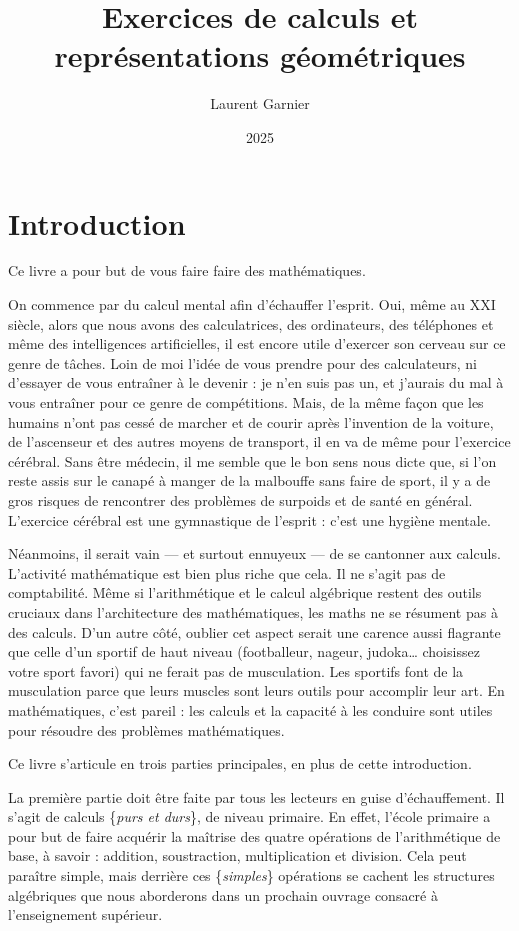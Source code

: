 \documentclass[11pt]{article}
\author{Laurent Garnier}
\date{2025}
\title{Exercices de calculs et représentations géométriques}
\begin{document}
\maketitle



\section{Introduction}
\label{sec:orgbdfe192}

Ce livre a pour but de vous faire faire des mathématiques. 

On commence par du calcul mental afin d’échauffer l’esprit. Oui, même
au XXI siècle, alors que nous avons des calculatrices, des
ordinateurs, des téléphones et même des intelligences artificielles,
il est encore utile d’exercer son cerveau sur ce genre de tâches. Loin
de moi l’idée de vous prendre pour des calculateurs, ni d’essayer de
vous entraîner à le devenir : je n’en suis pas un, et j’aurais du mal
à vous entraîner pour ce genre de compétitions. Mais, de la même façon
que les humains n’ont pas cessé de marcher et de courir après
l’invention de la voiture, de l’ascenseur et des autres moyens de
transport, il en va de même pour l’exercice cérébral. Sans être
médecin, il me semble que le bon sens nous dicte que, si l’on reste
assis sur le canapé à manger de la malbouffe sans faire de sport, il y
a de gros risques de rencontrer des problèmes de surpoids et de santé
en général. L’exercice cérébral est une gymnastique de l’esprit :
c’est une hygiène mentale.


Néanmoins, il serait vain — et surtout ennuyeux — de se cantonner aux
calculs. L’activité mathématique est bien plus riche que cela. Il ne
s’agit pas de comptabilité. Même si l’arithmétique et le calcul
algébrique restent des outils cruciaux dans l’architecture des
mathématiques, les maths ne se résument pas à des calculs. D’un autre
côté, oublier cet aspect serait une carence aussi flagrante que celle
d’un sportif de haut niveau (footballeur, nageur, judoka… choisissez
votre sport favori) qui ne ferait pas de musculation. Les sportifs
font de la musculation parce que leurs muscles sont leurs outils pour
accomplir leur art. En mathématiques, c’est pareil : les calculs et la
capacité à les conduire sont utiles pour résoudre des problèmes
mathématiques.


Ce livre s’articule en trois parties principales, en plus de cette
introduction.


La première partie doit être faite par tous les lecteurs en guise
d’échauffement. Il s’agit de calculs \frquote\{\textit{purs et durs}\},
de niveau primaire. En effet, l’école primaire a pour but de faire
acquérir la maîtrise des quatre opérations de l’arithmétique de base,
à savoir : addition, soustraction, multiplication et division. Cela
peut paraître simple, mais derrière ces \frquote\{\textit{simples}\}
opérations se cachent les structures algébriques que nous aborderons
dans un prochain ouvrage consacré à l’enseignement supérieur.
\end{document}
